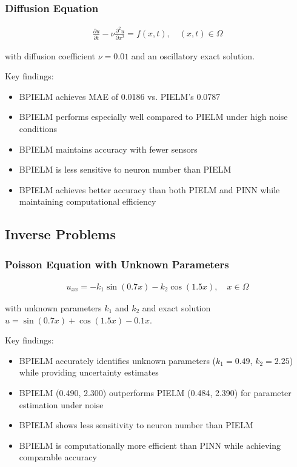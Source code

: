 \documentclass[11pt]{article}
\begin{document}
\subsubsection{Diffusion Equation}

\begin{align}
    \frac{\partial u}{\partial t} - \nu\frac{\partial^2 u}{\partial x^2} = f(x,t), \quad (x,t) \in \Omega
\end{align}

with diffusion coefficient $\nu = 0.01$ and an oscillatory exact solution.

Key findings:
\begin{itemize}
    \item BPIELM achieves MAE of 0.0186 vs. PIELM's 0.0787
    \item BPIELM performs especially well compared to PIELM under high noise conditions
    \item BPIELM maintains accuracy with fewer sensors
    \item BPIELM is less sensitive to neuron number than PIELM
    \item BPIELM achieves better accuracy than both PIELM and PINN while maintaining computational efficiency
\end{itemize}

\subsection{Inverse Problems}

\subsubsection{Poisson Equation with Unknown Parameters}

\begin{align}
    u_{xx} = -k_1\sin(0.7x) - k_2\cos(1.5x), \quad x \in \Omega
\end{align}

with unknown parameters $k_1$ and $k_2$ and exact solution $u = \sin(0.7x) + \cos(1.5x) - 0.1x$.

Key findings:
\begin{itemize}
    \item BPIELM accurately identifies unknown parameters ($k_1 = 0.49$, $k_2 = 2.25$) while providing uncertainty estimates
    \item BPIELM (0.490, 2.300) outperforms PIELM (0.484, 2.390) for parameter estimation under noise
    \item BPIELM shows less sensitivity to neuron number than PIELM
    \item BPIELM is computationally more efficient than PINN while achieving comparable accuracy
\end{itemize}
\end{document}
